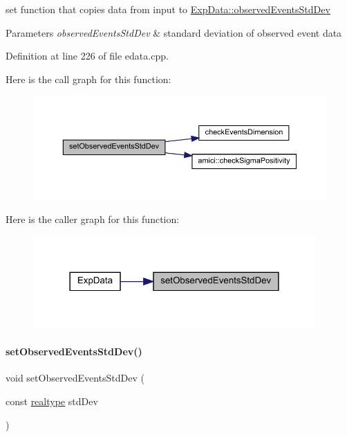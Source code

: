 set function that copies data from input to \mbox{\hyperlink{classamici_1_1_exp_data_abb12a8f75b4e6c936ae6c0be770628c9}{Exp\+Data\+::observed\+Events\+Std\+Dev}}


\begin{DoxyParams}{Parameters}
{\em observed\+Events\+Std\+Dev} & standard deviation of observed event data \\
\hline
\end{DoxyParams}


Definition at line 226 of file edata.\+cpp.

Here is the call graph for this function\+:
\nopagebreak
\begin{figure}[H]
\begin{center}
\leavevmode
\includegraphics[width=350pt]{classamici_1_1_exp_data_af55c1775810031cd4b6e283f6dd220be_cgraph}
\end{center}
\end{figure}
Here is the caller graph for this function\+:
\nopagebreak
\begin{figure}[H]
\begin{center}
\leavevmode
\includegraphics[width=306pt]{classamici_1_1_exp_data_af55c1775810031cd4b6e283f6dd220be_icgraph}
\end{center}
\end{figure}
\mbox{\label{classamici_1_1_exp_data_a7be54ad0b0116325f4955f10a759a018}} 
\paragraph{\texorpdfstring{setObservedEventsStdDev()}{setObservedEventsStdDev()}\hspace{0.1cm}{\footnotesize\ttfamily [2/4]}}
{\footnotesize\ttfamily void set\+Observed\+Events\+Std\+Dev (\begin{DoxyParamCaption}\item[{const \mbox{\hyperlink{namespaceamici_a1bdce28051d6a53868f7ccbf5f2c14a3}{realtype}}}]{std\+Dev }\end{DoxyParamCaption})}

